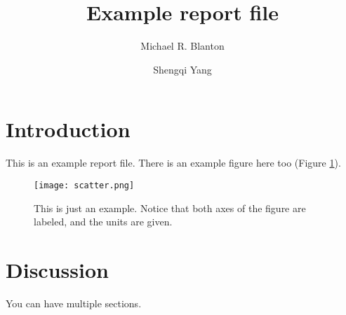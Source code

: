 \documentclass[11pt]{article}
\title{Example report file}
\author{Michael R. Blanton \and Shengqi Yang}
\begin{document}
\maketitle

\section{Introduction}

This is an example report file. There is an example figure here too
(Figure \ref{fig:example}).

\begin{figure}[b!]
\centering
\texttt{[image: scatter.png]}
\caption{ \label{fig:example} This is just an example. Notice that
  both axes of the figure are labeled, and the units are given.}
\end{figure}
  
\section{Discussion}

You can have multiple sections.
\end{document}
